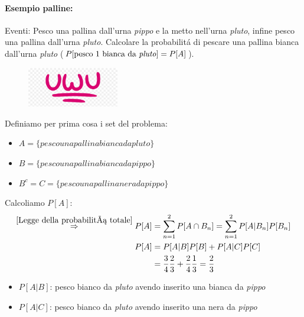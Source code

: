             \paragraph{Esempio palline:}
                Eventi: Pesco una pallina dall'urna \emph{pippo} e la metto nell'urna \emph{pluto}, infine pesco una pallina dall'urna \emph{pluto}.
                Calcolare la probabilitá di pescare una pallina bianca dall'urna \emph{pluto} ($P[\text{pesco 1 bianca da \emph{pluto}}] = P[A]$).  
                \begin{figure}[H]
                    \centering
                    \includegraphics[width = 4cm]{media/uwu.png}
                \end{figure}
                Definiamo per prima cosa i set del problema:
                \begin{itemize}
                    \item {$A = \{ pesco una pallina bianca da pluto\}$}
                    \item {$B = \{ pesco una pallina bianca da pippo\}$}
                    \item {$B^c = C = \{ pesco una pallina nera da pippo\}$}
                \end{itemize}
                Calcoliamo $P[A]$:
                \begin{align}
                    \overset{\ref{Legge della probabilitá totale}}{\Rightarrow} P[A] &= \sum_{n=1}^{2} P[A\cap B_n] = \sum_{n=1}^{2} P[A|B_n] P[B_n] \nonumber \\
                    P[A] &= P[A|B]P[B] + P[A|C]P[C] \nonumber \\
                         &= \frac{3}{4}\frac{2}{3} + \frac{2}{4}\frac{1}{3} = \frac{2}{3}  \nonumber       
                \end{align}
                \begin{itemize}
                    \item {$P[A|B]$: pesco bianco da \emph{pluto} avendo inserito una bianca da \emph{pippo}}
                    \item {$P[A|C]$: pesco bianco da \emph{pluto} avendo inserito una nera da \emph{pippo}}
                \end{itemize}

